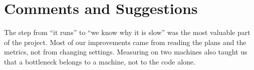 \documentclass[sigconf]{acmart}
\begin{document}
\section*{Comments and Suggestions}

The step from ``it runs'' to ``we know why it is slow'' was the most valuable part of the project. Most of our
improvements came from reading the plans and the metrics, not from changing settings. Measuring on two machines
also taught us that a bottleneck belongs to a machine, not to the code alone.



\end{document}
